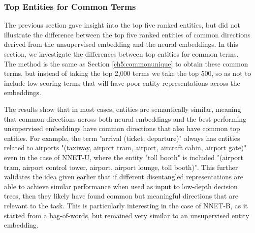 \subsubsection{Top Entities for Common Terms}\label{ch5:commonterms}

The previous section gave insight into the  top five ranked entities, but did not illustrate the difference between the top five ranked entities  of  common directions derived from  the unsupervised embedding and the neural   embeddings.  In this section, we investigate the differences between top entities for common terms. The method is the same as Section \ref{ch5:commonunique} to obtain these common terms, but instead of taking the top 2,000 terms we take the top 500, so as not to include low-scoring terms that will have poor entity representations across the embeddings. 

The results show that in most cases, entities are semantically similar, meaning that common directions across both neural embeddings and the best-performing unsupervised embeddings have common directions that also have common top entities. For example, the term "arrival (ticket, departure)" always has entities related to airports "(taxiway, airport tram, airport, aircraft cabin, airport gate)" even in the case of NNET-U, where the entity "toll booth" is included "(airport tram, airport control tower, airport, airport lounge, toll booth)".  This further validates the idea given earlier that if different disentangled representations are able to achieve similar performance when used as input to low-depth decision trees, then they likely have found common but meaningful directions that are relevant to the task. This is particularly interesting in the case of NNET-B, as it started from a bag-of-words, but remained very similar to an unsupervised entity embedding. %

